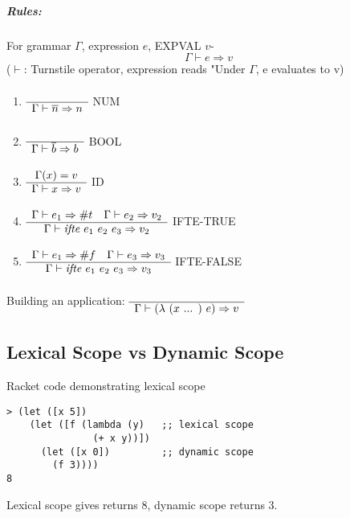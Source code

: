\subparagraph{Rules:}


For grammar $\Gamma$, expression $e$, EXPVAL $v$-
\[\Gamma \vdash e \Rightarrow v \]
($\vdash$: Turnstile operator, expression reads "Under $\Gamma$, e evaluates to v) \newline

\begin{enumerate}
\item $\begin{array}{c}  \\ \hline \Gamma \vdash \overline{n} \Rightarrow n \end{array}$ NUM
\item $\begin{array}{c}  \\ \hline \Gamma \vdash \overline{b} \Rightarrow b \end{array}$ BOOL
\item $\begin{array}{c} \Gamma(x) = v \\ \hline \Gamma \vdash x \Rightarrow v \end{array}$ ID
\item $\begin{array}{c} \Gamma \vdash e_{1} \Rightarrow \#t \quad \Gamma \vdash e_{2} \Rightarrow v_{2} \\ \hline \Gamma \vdash \textit{ifte } e_{1} \text{ } e_{2} \text{ } e_{3} \Rightarrow v_{2} \end{array}$ IFTE-TRUE
\item $\begin{array}{c} \Gamma \vdash e_{1} \Rightarrow \#f \quad \Gamma \vdash e_{3} \Rightarrow v_{3} \\ \hline \Gamma \vdash \textit{ifte } e_{1} \text{ } e_{2} \text{ } e_{3} \Rightarrow v_{3} \end{array}$ IFTE-FALSE
\end{enumerate}

Building an application:
$\begin{array}{c}  \\ \hline \Gamma \vdash (\lambda \text{ } (x \text{ ... }) \text{ } e) \Rightarrow v \end{array}$


\subsection{Lexical Scope vs Dynamic Scope}
Racket code demonstrating lexical scope\newline
\begin{verbatim}
> (let ([x 5])
    (let ([f (lambda (y)   ;; lexical scope
               (+ x y))])
      (let ([x 0])         ;; dynamic scope
        (f 3))))
8
\end{verbatim}

Lexical scope gives returns 8, dynamic scope returns 3.
